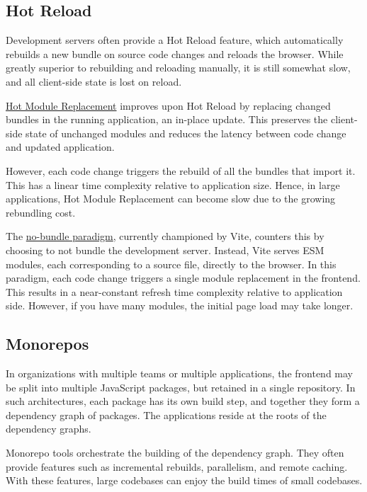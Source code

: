 \documentclass{article}
\begin{document}
\subsection{Hot Reload}

Development servers often provide a Hot Reload feature, which automatically rebuilds a new bundle on
source code changes and reloads the browser. While greatly superior to rebuilding and reloading
manually, it is still somewhat slow, and all client-side state is lost on reload.

\href{https://webpack.js.org/concepts/hot-module-replacement/}{Hot Module Replacement} improves upon
Hot Reload by replacing changed bundles in the running application, an in-place update. This
preserves the client-side state of unchanged modules and reduces the latency between code change and
updated application.

However, each code change triggers the rebuild of all the bundles that import it. This has a linear
time complexity relative to application size. Hence, in large applications, Hot Module Replacement
can become slow due to the growing rebundling cost.

The \href{https://vitejs.dev/guide/why.html}{no-bundle paradigm}, currently championed by Vite,
counters this by choosing to not bundle the development server. Instead, Vite serves ESM modules,
each corresponding to a source file, directly to the browser. In this paradigm, each code change
triggers a single module replacement in the frontend. This results in a near-constant refresh time
complexity relative to application side. However, if you have many modules, the initial page load
may take longer.

\subsection{Monorepos}

In organizations with multiple teams or multiple applications, the frontend may be split into
multiple JavaScript packages, but retained in a single repository. In such architectures, each
package has its own build step, and together they form a dependency graph of packages. The
applications reside at the roots of the dependency graphs.

Monorepo tools orchestrate the building of the dependency graph. They often provide features such as
incremental rebuilds, parallelism, and remote caching. With these features, large codebases can
enjoy the build times of small codebases.
\end{document}

